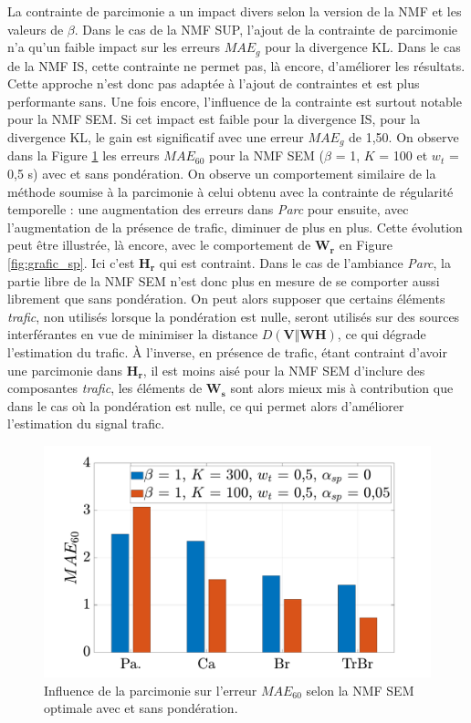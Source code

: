 La contrainte de parcimonie a un impact divers selon la version de la NMF et les valeurs de $\beta$. Dans le cas de la NMF SUP, l'ajout de la contrainte de parcimonie n'a qu'un faible impact sur les erreurs $MAE_g$ pour la divergence KL.  Dans le cas de la NMF IS, cette contrainte ne permet pas, là encore, d'améliorer les résultats. Cette approche n'est donc pas adaptée à l'ajout de contraintes et est plus performante sans.
Une fois encore, l'influence de la contrainte est surtout notable pour la NMF SEM. Si cet impact est faible pour la divergence IS, pour la divergence KL, le gain est significatif avec une erreur $MAE_g$ de 1,50. On observe dans la Figure  \ref{fig:erreurSparseDetails} les erreurs $MAE_{60}$ pour la NMF SEM ($\beta$ = 1, $K$ = 100 et $w_t$ = 0,5 s) avec et sans pondération. On observe un comportement similaire de la méthode soumise à la parcimonie à celui obtenu avec la contrainte de régularité temporelle : une augmentation des erreurs dans \textit{Parc} pour ensuite, avec l'augmentation de la présence de trafic, diminuer de plus en plus. Cette évolution peut être illustrée, là encore, avec le comportement de $\mathbf{W_r}$ en Figure \ref{fig:grafic_sp}. Ici c'est $\mathbf{H_r}$ qui est contraint. Dans le cas de l'ambiance \textit{Parc}, la partie libre de la NMF SEM n'est donc plus en mesure de se comporter aussi librement que sans pondération. On peut alors supposer que certains éléments \textit{trafic}, non utilisés lorsque la pondération est nulle, seront utilisés sur des sources interférantes en vue de minimiser la distance $D(\mathbf{V}\Vert \mathbf{WH})$, ce qui dégrade l'estimation du trafic.
\`A l'inverse, en présence de trafic, étant contraint d'avoir une parcimonie dans $\mathbf{H_r}$, il est moins aisé pour la NMF SEM d'inclure des composantes \textit{trafic}, les éléments de $\mathbf{W_s}$ sont alors mieux mis à contribution que dans le cas où la pondération est nulle, ce qui permet alors d'améliorer l'estimation du signal trafic.

\begin{figure}[h]
\centering
\includegraphics[width=.7\linewidth]{./figures/resultats/bar_sparse.pdf}
\caption{Influence de la parcimonie sur l'erreur $MAE_{60}$ selon la NMF SEM optimale avec et sans pondération.}
\label{fig:erreurSparseDetails}
\end{figure}

